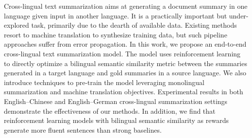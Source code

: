 Cross-lingual text summarization aims at generating a document summary in one language given input in another language. It is a practically important but under-explored task, primarily due to the dearth of available data. Existing methods resort to machine translation to synthesize training data, but such pipeline approaches suffer from error propagation. In this work, we propose an end-to-end cross-lingual text summarization model. The model uses reinforcement learning to directly optimize a bilingual semantic similarity metric between the summaries generated in a target language and gold summaries in a source language. We also introduce techniques to pre-train the model leveraging monolingual summarization and machine translation objectives. Experimental results in both English--Chinese and English--German cross-lingual summarization settings demonstrate the effectiveness of our methods. In addition, we find that reinforcement learning models with bilingual semantic similarity as rewards generate more fluent sentences than strong baselines.
